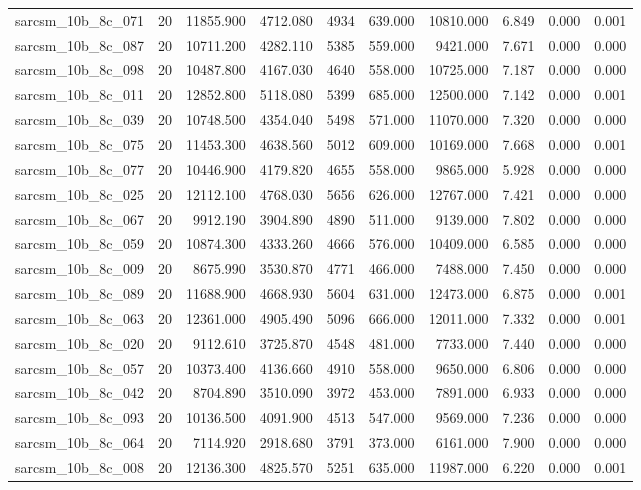 \begin{tabular}{lrrrrrrrrr}
sarcsm\_10b\_8c\_071 & 20 & 11855.900 & 4712.080 & 4934 & 639.000 & 10810.000 & 6.849 & 0.000 & 0.001 \\
sarcsm\_10b\_8c\_087 & 20 & 10711.200 & 4282.110 & 5385 & 559.000 & 9421.000 & 7.671 & 0.000 & 0.000 \\
sarcsm\_10b\_8c\_098 & 20 & 10487.800 & 4167.030 & 4640 & 558.000 & 10725.000 & 7.187 & 0.000 & 0.000 \\
sarcsm\_10b\_8c\_011 & 20 & 12852.800 & 5118.080 & 5399 & 685.000 & 12500.000 & 7.142 & 0.000 & 0.001 \\
sarcsm\_10b\_8c\_039 & 20 & 10748.500 & 4354.040 & 5498 & 571.000 & 11070.000 & 7.320 & 0.000 & 0.000 \\
sarcsm\_10b\_8c\_075 & 20 & 11453.300 & 4638.560 & 5012 & 609.000 & 10169.000 & 7.668 & 0.000 & 0.001 \\
sarcsm\_10b\_8c\_077 & 20 & 10446.900 & 4179.820 & 4655 & 558.000 & 9865.000 & 5.928 & 0.000 & 0.000 \\
sarcsm\_10b\_8c\_025 & 20 & 12112.100 & 4768.030 & 5656 & 626.000 & 12767.000 & 7.421 & 0.000 & 0.000 \\
sarcsm\_10b\_8c\_067 & 20 & 9912.190 & 3904.890 & 4890 & 511.000 & 9139.000 & 7.802 & 0.000 & 0.000 \\
sarcsm\_10b\_8c\_059 & 20 & 10874.300 & 4333.260 & 4666 & 576.000 & 10409.000 & 6.585 & 0.000 & 0.000 \\
sarcsm\_10b\_8c\_009 & 20 & 8675.990 & 3530.870 & 4771 & 466.000 & 7488.000 & 7.450 & 0.000 & 0.000 \\
sarcsm\_10b\_8c\_089 & 20 & 11688.900 & 4668.930 & 5604 & 631.000 & 12473.000 & 6.875 & 0.000 & 0.001 \\
sarcsm\_10b\_8c\_063 & 20 & 12361.000 & 4905.490 & 5096 & 666.000 & 12011.000 & 7.332 & 0.000 & 0.001 \\
sarcsm\_10b\_8c\_020 & 20 & 9112.610 & 3725.870 & 4548 & 481.000 & 7733.000 & 7.440 & 0.000 & 0.000 \\
sarcsm\_10b\_8c\_057 & 20 & 10373.400 & 4136.660 & 4910 & 558.000 & 9650.000 & 6.806 & 0.000 & 0.000 \\
sarcsm\_10b\_8c\_042 & 20 & 8704.890 & 3510.090 & 3972 & 453.000 & 7891.000 & 6.933 & 0.000 & 0.000 \\
sarcsm\_10b\_8c\_093 & 20 & 10136.500 & 4091.900 & 4513 & 547.000 & 9569.000 & 7.236 & 0.000 & 0.000 \\
sarcsm\_10b\_8c\_064 & 20 & 7114.920 & 2918.680 & 3791 & 373.000 & 6161.000 & 7.900 & 0.000 & 0.000 \\
sarcsm\_10b\_8c\_008 & 20 & 12136.300 & 4825.570 & 5251 & 635.000 & 11987.000 & 6.220 & 0.000 & 0.001 \\

\end{tabular}
